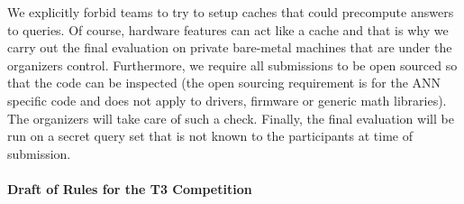 We explicitly forbid teams to try to setup caches that could
precompute answers to queries. Of course, hardware features can act
like a cache and that is why we carry out the final evaluation on
private bare-metal machines that are under the organizers control.
Furthermore, we require all submissions to be open sourced so that the
code can be inspected (the open sourcing requirement is for the ANN
specific code and does not apply to drivers, firmware or generic math
libraries).  The organizers will take care of such a check.  Finally,
the final evaluation will be run on a secret query set that is not
known to the participants at time of submission.


\paragraph{Draft of Rules for the T3 Competition}

